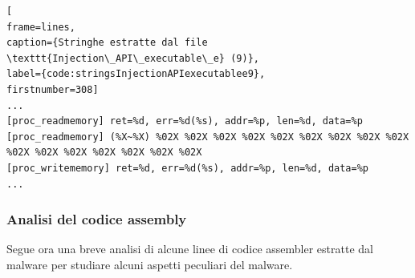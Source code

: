 \documentclass[10pt,a4paper, titlepage]{report}
\begin{document}
\begin{lstlisting}[
frame=lines, 
caption={Stringhe estratte dal file \texttt{Injection\_API\_executable\_e} (9)}, 
label={code:stringsInjectionAPIexecutablee9},
firstnumber=308]
...
[proc_readmemory] ret=%d, err=%d(%s), addr=%p, len=%d, data=%p
[proc_readmemory] (%X~%X) %02X %02X %02X %02X %02X %02X %02X %02X %02X %02X %02X %02X %02X %02X %02X %02X
[proc_writememory] ret=%d, err=%d(%s), addr=%p, len=%d, data=%p
...
\end{lstlisting}


	\newpage
\subsubsection{Analisi del codice assembly}
	
Segue ora una breve analisi di alcune linee di codice assembler estratte dal malware per studiare alcuni aspetti peculiari del malware.
	
\end{document}
